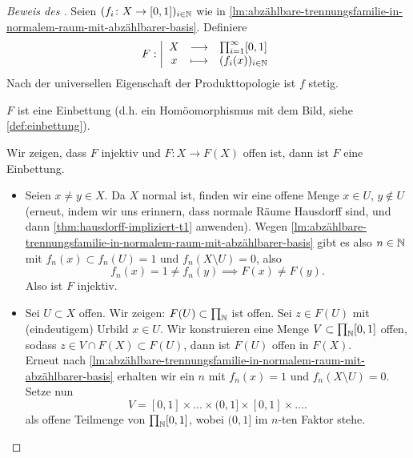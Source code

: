 \begin{proof}[Beweis des ]
    Seien $(f_i \colon X \to  [0,1])_{i\in \mathbb{N}}$ wie in \autoref{lm:abzählbare-trennungsfamilie-in-normalem-raum-mit-abzählbarer-basis}. Definiere
        \begin{equation*}
        F: \left| \begin{array}{c c l} 
            X & \longrightarrow & \prod_{i=1}^{\infty}[0,1] \\
            x & \longmapsto &  (f_i(x))_{i\in \mathbb{N}}
        \end{array} \right.
    \end{equation*}
    Nach der universellen Eigenschaft der Produkttopologie ist $f$ stetig.
     \begin{claim}
         $F$ ist eine Einbettung (d.h. ein Homöomorphismus mit dem Bild, siehe \autoref{def:einbettung}).
    \end{claim}
    \begin{subproof}
        Wir zeigen, dass $F$ injektiv und $F\colon X\to F(X)$ offen ist, dann ist  $F$ eine Einbettung.
        \begin{itemize}
            \item Seien $x\neq y\in X$. Da $X$ normal ist, finden wir eine offene Menge $x\in U$, $y\not\in U$ (erneut, indem wir uns erinnern, dass normale Räume Hausdorff sind, und dann \autoref{thm:hausdorff-impliziert-t1} anwenden). Wegen \autoref{lm:abzählbare-trennungsfamilie-in-normalem-raum-mit-abzählbarer-basis} gibt es also $n\in \mathbb{N}$ mit $f_n(x) \subset f_n(U) = 1$ und  $f_n(X\setminus U) = 0$, also 
                \[
                    f_n(x) = 1 \neq  f_n(y) \implies F(x) \neq  F(y)
                .\] 
                Also ist $F$ injektiv.
            \item Sei $U\subset X$ offen. Wir zeigen: $F(U)\subset \prod_{\mathbb{N}}$ ist offen. Sei $z\in F(U)$ mit (eindeutigem) Urbild $x\in U$. Wir konstruieren eine Menge $V\subset \prod_{\mathbb{N}}[0,1]$ offen, sodass $z\in V \cap F(X)\subset F(U)$, dann ist $F(U)$ offen in  $F(X)$. \\
                Erneut nach \autoref{lm:abzählbare-trennungsfamilie-in-normalem-raum-mit-abzählbarer-basis} erhalten wir ein $n$ mit $f_n(x) = 1$ und  $f_n (X\setminus U) = 0$. Setze nun
                \[
                    V = [0,1] \times  \ldots \times  (0,1] \times [0,1] \times \ldots
                .\] 
                als offene Teilmenge von $\prod_{\mathbb{N}}[0,1]$, wobei $(0,1]$ im  $n$-ten Faktor stehe.
                \begin{claim}

\end{claim}
\end{itemize}
\end{subproof}
\end{proof}
